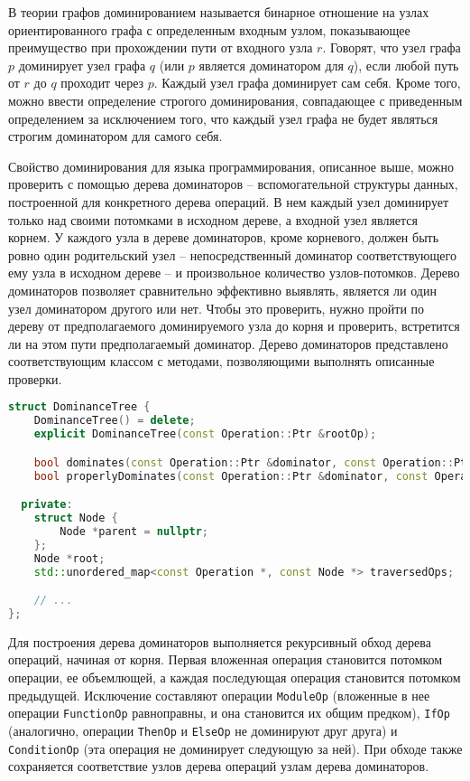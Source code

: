 В теории графов доминированием называется бинарное отношение на узлах ориентированного графа с определенным входным узлом, показывающее преимущество при прохождении пути от входного узла \(r\).
Говорят, что узел графа \(p\) доминирует узел графа \(q\) (или \(p\) является доминатором для \(q\)), если любой путь от \(r\) до \(q\) проходит через \(p\).
Каждый узел графа доминирует сам себя.
Кроме того, можно ввести определение строгого доминирования, совпадающее с приведенным определением за исключением того, что каждый узел графа не будет являться строгим доминатором для самого себя.

Свойство доминирования для языка программирования, описанное выше, можно проверить с помощью дерева доминаторов -- вспомогательной структуры данных, построенной для конкретного дерева операций.
В нем каждый узел доминирует только над своими потомками в исходном дереве, а входной узел является корнем.
У каждого узла в дереве доминаторов, кроме корневого, должен быть ровно один родительский узел -- непосредственный доминатор соответствующего ему узла в исходном дереве -- и произвольное количество узлов-потомков.
Дерево доминаторов позволяет сравнительно эффективно выявлять, является ли один узел доминатором другого или нет.
Чтобы это проверить, нужно пройти по дереву от предполагаемого доминируемого узла до корня и проверить, встретится ли на этом пути предполагаемый доминатор.
Дерево доминаторов представлено соответствующим классом с методами, позволяющими выполнять описанные проверки.

\begin{lstlisting}[language=C++, caption=Объявление класса DominanceTree]
struct DominanceTree {
    DominanceTree() = delete;
    explicit DominanceTree(const Operation::Ptr &rootOp);

    bool dominates(const Operation::Ptr &dominator, const Operation::Ptr &dominated) const;
    bool properlyDominates(const Operation::Ptr &dominator, const Operation::Ptr &dominated) const;

  private:
    struct Node {
        Node *parent = nullptr;
    };
    Node *root;
    std::unordered_map<const Operation *, const Node *> traversedOps;

    // ...
};
\end{lstlisting}

Для построения дерева доминаторов выполняется рекурсивный обход дерева операций, начиная от корня.
Первая вложенная операция становится потомком операции, ее объемлющей, а каждая последующая операция становится потомком предыдущей.
Исключение составляют операции \verb|ModuleOp| (вложенные в нее операции \verb|FunctionOp| равноправны, и она становится их общим предком), \verb|IfOp| (аналогично, операции \verb|ThenOp| и \verb|ElseOp| не доминируют друг друга) и \verb|ConditionOp| (эта операция не доминирует следующую за ней).
При обходе также сохраняется соответствие узлов дерева операций узлам дерева доминаторов.

